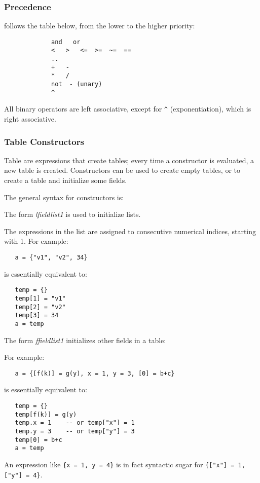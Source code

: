 \subsubsection{Precedence}
 follows the table below,
from the lower to the higher priority:
\begin{verbatim}
             and   or
             <   >   <=  >=  ~=  ==
             ..
             +   -
             *   /
             not  - (unary)
             ^
\end{verbatim}
All binary operators are left associative,
except for \verb|^| (exponentiation),
which is right associative.

\subsubsection{Table Constructors} \label{tableconstructor}
Table  are expressions that create tables;
every time a constructor is evaluated, a new table is created.
Constructors can be used to create empty tables,
or to create a table and initialize some fields.

The general syntax for constructors is:
\begin{Produc}
\end{Produc}

The form \emph{lfieldlist1} is used to initialize lists.
\begin{Produc}
\end{Produc}%
The expressions in the list are assigned to consecutive numerical indices,
starting with 1.
For example:
\begin{verbatim}
   a = {"v1", "v2", 34}
\end{verbatim}
is essentially equivalent to:
\begin{verbatim}
   temp = {}
   temp[1] = "v1"
   temp[2] = "v2"
   temp[3] = 34
   a = temp
\end{verbatim}

The form \emph{ffieldlist1} initializes other fields in a table:
\begin{Produc}
\end{Produc}%
For example:
\begin{verbatim}
   a = {[f(k)] = g(y), x = 1, y = 3, [0] = b+c}
\end{verbatim}
is essentially equivalent to:
\begin{verbatim}
   temp = {}
   temp[f(k)] = g(y)
   temp.x = 1    -- or temp["x"] = 1
   temp.y = 3    -- or temp["y"] = 3
   temp[0] = b+c
   a = temp
\end{verbatim}
An expression like \verb|{x = 1, y = 4}| is
in fact syntactic sugar for \verb|{["x"] = 1, ["y"] = 4}|.

